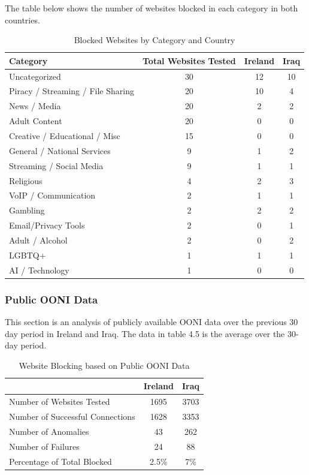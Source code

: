 The table below shows the number of websites blocked in each category in both countries.

\begin{table}[H]
\centering
\caption{Blocked Websites by Category and Country}
\begin{tabular}{lccc}
\toprule
\textbf{Category} & \textbf{Total Websites Tested} & \textbf{Ireland} & \textbf{Iraq} \\
\midrule
Uncategorized                      & 30 & 12 & 10 \\
Piracy / Streaming / File Sharing  & 20 & 10 & 4 \\
News / Media                       & 20 & 2 & 2 \\
Adult Content                      & 20 & 0 & 0 \\
Creative / Educational / Misc      & 15 & 0 & 0 \\
General / National Services        & 9 & 1 & 2 \\
Streaming / Social Media           & 9 & 1 & 1 \\
Religious                          & 4 & 2 & 3 \\
VoIP / Communication               & 2 & 1 & 1 \\
Gambling                           & 2 & 2 & 2 \\
Email/Privacy Tools                & 2 & 0 & 1 \\
Adult / Alcohol                    & 2 & 0 & 2 \\
LGBTQ+                             & 1 & 1 & 1 \\
AI / Technology                    & 1 & 0 & 0 \\
\bottomrule
\end{tabular}
\label{tab:category_block}
\end{table}

\subsubsection{Public OONI Data}

This section is an analysis of publicly available OONI data over the previous 30 day period in Ireland and Iraq. The data in table 4.5 is the average over the 30-day period.

\begin{table}[H]
\centering
\caption{Website Blocking based on Public OONI Data}
\begin{tabular}{lcc}
\toprule
\textbf{} & \textbf{Ireland} & \textbf{Iraq} \\
\midrule
Number of Websites Tested           & 1695 & 3703 \\
Number of Successful Connections    & 1628 & 3353 \\
Number of Anomalies                 & 43 & 262 \\
Number of Failures                  & 24 & 88 \\
\bottomrule
Percentage of Total Blocked         & 2.5\% & 7\% \\
\end{tabular}
\label{tab:category_block}
\end{table}


